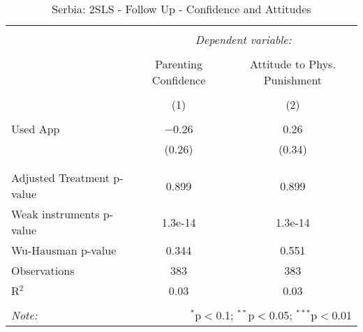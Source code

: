 
\begin{table}[!htbp] \centering 
  \caption{Serbia: 2SLS - Follow Up - Confidence and Attitudes} 
  \label{tbl:Serbia: 2SLS - Follow Up - Confidence and Attitudes} 
\begin{tabular}{@{\extracolsep{5pt}}lcc} 
\\[-1.8ex]\hline 
\hline \\[-1.8ex] 
 & \multicolumn{2}{c}{\textit{Dependent variable:}} \\ 
\cline{2-3} 
\\[-1.8ex] & Parenting Confidence & Attitude to Phys. Punishment \\ 
\\[-1.8ex] & (1) & (2)\\ 
\hline \\[-1.8ex] 
 Used App & $-$0.26 & 0.26 \\ 
  & (0.26) & (0.34) \\ 
  & & \\ 
\hline \\[-1.8ex] 
Adjusted Treatment p-value & 0.899 & 0.899 \\ 
Weak instruments p-value & 1.3e-14 & 1.3e-14 \\ 
Wu-Hausman p-value & 0.344 & 0.551 \\ 
Observations & 383 & 383 \\ 
R$^{2}$ & 0.03 & 0.03 \\ 
\hline 
\hline \\[-1.8ex] 
\textit{Note:}  & \multicolumn{2}{r}{$^{*}$p$<$0.1; $^{**}$p$<$0.05; $^{***}$p$<$0.01} \\ 
\end{tabular} 
\end{table} 
